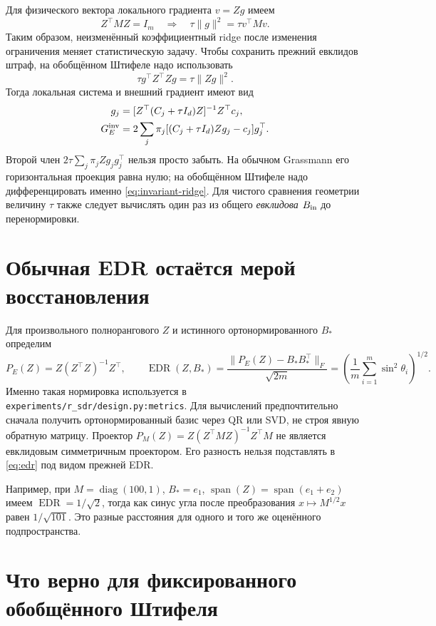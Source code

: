 \documentclass[11pt,a4paper]{article}
\newcommand{\spn}{\operatorname{span}}
\newcommand{\diag}{\operatorname{diag}}
\newcommand{\EDR}{\operatorname{EDR}}
\newcommand{\norm}[1]{\lVert#1\rVert}
\newcommand{\code}[1]{\nolinkurl{#1}}
\theoremstyle{remark}
\begin{document}
Для физического вектора локального градиента $v=Zg$ имеем
\[
 Z^\top MZ=I_m\quad\Longrightarrow\quad
 \tau\norm{g}^2=\tau v^\top Mv.
\]
Таким образом, неизменённый коэффициентный ridge после изменения
ограничения меняет статистическую задачу. Чтобы сохранить прежний
евклидов штраф, на обобщённом Штифеле надо использовать
\begin{equation}\label{eq:invariant-ridge}
 \tau g^\top Z^\top Zg=\tau\norm{Zg}^2.
\end{equation}
Тогда локальная система и внешний градиент имеют вид
\begin{align}\label{eq:invariant-gradient}
 g_j&=[Z^\top(C_j+\tau I_d)Z]^{-1}Z^\top c_j,\nonumber\\
 G_E^{\rm inv}&=2\sum_j\pi_j[(C_j+\tau I_d)Zg_j-c_j]g_j^\top.
\end{align}
Второй член $2\tau\sum_j\pi_jZg_jg_j^\top$ нельзя просто забыть.
На обычном Grassmann его горизонтальная проекция равна нулю; на
обобщённом Штифеле надо дифференцировать именно \eqref{eq:invariant-ridge}.
Для чистого сравнения геометрии величину $\tau$ также следует вычислять
один раз из общего \emph{евклидова} $B_{\rm in}$ до перенормировки.

\section{Обычная EDR остаётся мерой восстановления}

Для произвольного полнорангового $Z$ и истинного ортонормированного
$B_*$ определим
\begin{equation}\label{eq:edr}
 P_E(Z)=Z(Z^\top Z)^{-1}Z^\top,\qquad
 \EDR(Z,B_*)=\frac{\norm{P_E(Z)-B_*B_*^\top}_F}{\sqrt{2m}}
 =\left(\frac1m\sum_{i=1}^m\sin^2\theta_i\right)^{1/2}.
\end{equation}
Именно такая нормировка используется в
\code{experiments/r_sdr/design.py:metrics}.
Для вычислений предпочтительно сначала получить ортонормированный базис
через QR или SVD, не строя явную обратную матрицу.
Проектор $P_M(Z)=Z(Z^\top MZ)^{-1}Z^\top M$ не является евклидовым
симметричным проектором. Его разность нельзя подставлять в
\eqref{eq:edr} под видом прежней EDR.

Например, при $M=\diag(100,1)$, $B_*=e_1$,
$\spn(Z)=\spn(e_1+e_2)$ имеем
$\EDR=1/\sqrt2$, тогда как синус угла после преобразования
$x\mapsto M^{1/2}x$ равен $1/\sqrt{101}$.
Это разные расстояния для одного и того же оценённого подпространства.

\section{Что верно для фиксированного обобщённого Штифеля}
\end{document}
